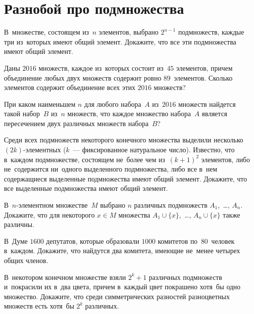 
\section*{Разнобой про подмножества}


\begin{problems}

\item
В~множестве, состоящем из~$n$ элементов, выбрано $2^{n-1}$ подмножеств, каждые
три из~которых имеют общий элемент.
Докажите, что все эти подмножества имеют общий элемент.

\item
Даны $2016$ множеств, каждое из~которых состоит из~$45$ элементов, причем
объединение любых двух множеств содержит ровно $89$~элементов.
Сколько элементов содержит объединение всех этих $2016$ множеств?

\item
При каком наименьшем $n$ для любого набора~$A$ из~$2016$ множеств найдется
такой набор~$B$ из~$n$ множеств, что каждое множество набора~$A$ является
пересечением двух различных множеств набора~$B$?

\item
Среди всех подмножеств некоторого конечного множества выделили несколько
$(2k)$-элементных ($k$~--- фиксированное натуральное число).
Известно, что в~каждом подмножестве, состоящем не~более чем
из~$(k + 1)^2$ элементов, либо не~содержится ни~одного выделенного
подмножества, либо все в~нем содержащиеся выделенные подмножества имеют общий
элемент.
Докажите, что все выделенные подмножества имеют общий элемент.

\item
В~$n$-элементном множестве~$M$ выбрано $n$ различных подмножеств
$A_{1}$,~\ldots, $A_{n}$.
Докажите, что для некоторого $x \in M$ множества
$A_{1} \cup \{x\}$,~\ldots, $A_{n} \cup \{x\}$ также различны.

\item
В~Думе $1600$ депутатов, которые образовали $1000$ комитетов по~$80$~человек
в~каждом.
Докажите, что найдутся два комитета, имеющие не~менее четырех общих членов.

\item
В~некотором конечном множестве взяли $2^k + 1$ различных подмножеств
и~покрасили их в~два цвета, причем в~каждый цвет покрашено хотя~бы одно
множество.
Докажите, что среди симметрических разностей разноцветных множеств есть хотя~бы
$2^k$ различных.

\end{problems}

